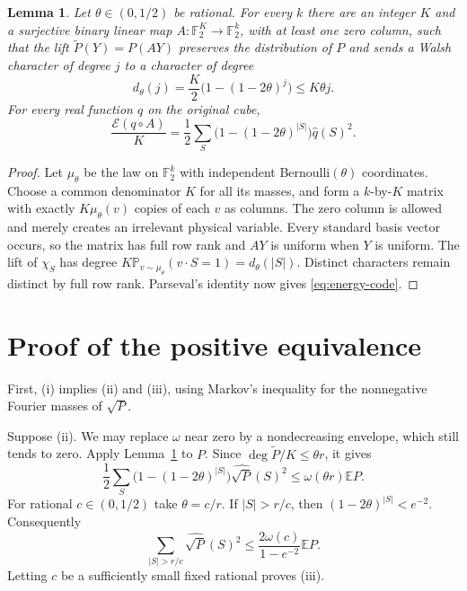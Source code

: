 \documentclass[10pt]{article}
\newtheorem{lemma}[theorem]{Lemma}
\newcommand{\E}{\mathbb E}
\newcommand{\Prb}{\mathbb P}
\newcommand{\En}{\mathcal E}
\newcommand{\F}{\mathbb F}
\begin{document}
\begin{lemma}\label{lem:code}
Let $\theta\in(0,1/2)$ be rational. For every $k$ there are an integer
$K$ and a surjective binary linear map $A:\F_2^K\to\F_2^k$, with at least
one zero column, such that
the lift $\widetilde P(Y)=P(AY)$ preserves the distribution of $P$ and
sends a Walsh character of degree $j$ to a character of degree
\[
 d_\theta(j)=\frac K2\bigl(1-(1-2\theta)^j\bigr)\le K\theta j.
\]
For every real function $q$ on the original cube,
\begin{equation}\label{eq:energy-code}
 \frac{\En(q\circ A)}K
  =\frac12\sum_S\bigl(1-(1-2\theta)^{|S|}\bigr)\widehat q(S)^2.
\end{equation}
\end{lemma}
\begin{proof}
Let $\mu_\theta$ be the law on $\F_2^k$ with independent
Bernoulli$(\theta)$ coordinates. Choose a common denominator $K$ for
all its masses, and form a $k$-by-$K$ matrix with exactly
$K\mu_\theta(v)$ copies of each $v$ as columns. The zero column is
allowed and merely creates an irrelevant physical variable. Every
standard basis vector occurs, so the matrix has full row rank and
$AY$ is uniform when $Y$ is uniform. The lift of $\chi_S$ has degree
$K\Prb_{v\sim\mu_\theta}(v\cdot S=1)=d_\theta(|S|)$.
Distinct characters remain distinct by full row rank. Parseval's
identity now gives \eqref{eq:energy-code}.
\end{proof}

\section{Proof of the positive equivalence}
First, (i) implies (ii) and (iii), using Markov's inequality for the
nonnegative Fourier masses of $\sqrt P$.

Suppose (ii). We may replace $\omega$ near zero by a nondecreasing
envelope, which still tends to zero. Apply Lemma~\ref{lem:code} to $P$.
Since $\deg\widetilde P/K\le\theta r$, it gives
\begin{equation}\label{eq:weak-noise}
 \frac12\sum_S\bigl(1-(1-2\theta)^{|S|}\bigr)
               \widehat{\sqrt P}(S)^2
       \le\omega(\theta r)\E P.
\end{equation}
For rational $c\in(0,1/2)$ take $\theta=c/r$. If $|S|>r/c$,
then $(1-2\theta)^{|S|}<e^{-2}$. Consequently
\[
 \sum_{|S|>r/c}\widehat{\sqrt P}(S)^2
 \le\frac{2\omega(c)}{1-e^{-2}}\E P.
\]
Letting $c$ be a sufficiently small fixed rational proves (iii).
\end{document}

